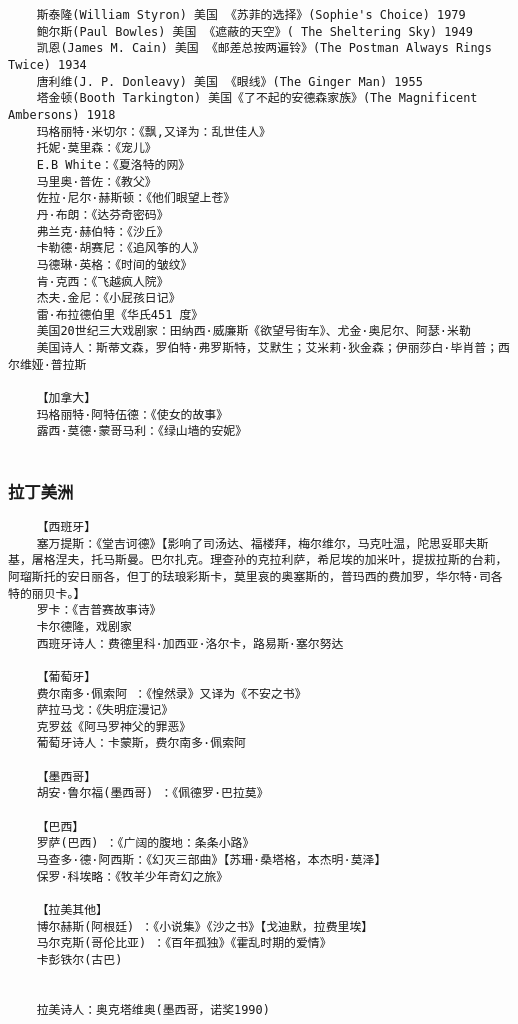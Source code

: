 \documentclass[UTF8]{../RepresentationUniverse}
\begin{document}
\begin{lstlisting}
    斯泰隆(William Styron) 美国 《苏菲的选择》(Sophie's Choice) 1979
    鲍尔斯(Paul Bowles) 美国 《遮蔽的天空》( The Sheltering Sky) 1949
    凯恩(James M. Cain) 美国 《邮差总按两遍铃》(The Postman Always Rings Twice) 1934
    唐利维(J. P. Donleavy) 美国 《眼线》(The Ginger Man) 1955
    塔金顿(Booth Tarkington) 美国《了不起的安德森家族》(The Magnificent Ambersons) 1918
    玛格丽特·米切尔：《飘,又译为：乱世佳人》
    托妮·莫里森：《宠儿》
    E.B White：《夏洛特的网》
    马里奥·普佐：《教父》
    佐拉·尼尔·赫斯顿：《他们眼望上苍》
    丹·布朗：《达芬奇密码》
    弗兰克·赫伯特：《沙丘》
    卡勒德·胡赛尼：《追风筝的人》
    马德琳·英格：《时间的皱纹》
    肯·克西：《飞越疯人院》
    杰夫.金尼：《小屁孩日记》
    雷·布拉德伯里《华氏451 度》
    美国20世纪三大戏剧家：田纳西·威廉斯《欲望号街车》、尤金·奥尼尔、阿瑟·米勒
    美国诗人：斯蒂文森，罗伯特·弗罗斯特，艾默生；艾米莉·狄金森；伊丽莎白·毕肖普；西尔维娅·普拉斯

    【加拿大】
    玛格丽特·阿特伍德：《使女的故事》
    露西·莫德·蒙哥马利：《绿山墙的安妮》
    
\end{lstlisting}




\subsubsection{拉丁美洲}
\begin{lstlisting}
    【西班牙】
    塞万提斯：《堂吉诃德》【影响了司汤达、福楼拜，梅尔维尔，马克吐温，陀思妥耶夫斯基，屠格涅夫，托马斯曼。巴尔扎克。理查孙的克拉利萨，希尼埃的加米叶，提拔拉斯的台莉，阿瑠斯托的安日丽各，但丁的珐琅彩斯卡，莫里哀的奥塞斯的，普玛西的费加罗，华尔特·司各特的丽贝卡。】
    罗卡：《吉普赛故事诗》
    卡尔德隆，戏剧家
    西班牙诗人：费德里科·加西亚·洛尔卡，路易斯·塞尔努达
    
    【葡萄牙】
    费尔南多·佩索阿 ：《惶然录》又译为《不安之书》
    萨拉马戈：《失明症漫记》
    克罗兹《阿马罗神父的罪恶》
    葡萄牙诗人：卡蒙斯，费尔南多·佩索阿

    【墨西哥】
    胡安·鲁尔福(墨西哥) ：《佩德罗·巴拉莫》

    【巴西】
    罗萨(巴西) ：《广阔的腹地：条条小路》
    马查多·德·阿西斯：《幻灭三部曲》【苏珊·桑塔格，本杰明·莫泽】
    保罗·科埃略：《牧羊少年奇幻之旅》

    【拉美其他】
    博尔赫斯(阿根廷) ：《小说集》《沙之书》【戈迪默，拉费里埃】
    马尔克斯(哥伦比亚) ：《百年孤独》《霍乱时期的爱情》
    卡彭铁尔(古巴) 


    拉美诗人：奥克塔维奥(墨西哥，诺奖1990) 
\end{lstlisting}
\end{document}
